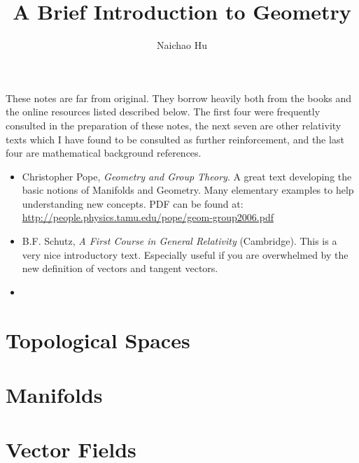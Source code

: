 \documentclass[a4paper,11pt]{article}
\title{\boldmath A Brief Introduction to Geometry}
\author{Naichao Hu}
\affiliation{Department of Physics,\\Sun Yat-sen University}
\begin{document}
 
\maketitle
\flushbottom


\clearpage

\acknowledgments
These notes are far from original. They borrow heavily both from the books 
and the online resources listed described below. 
The first 
four 
were frequently consulted in the preparation of these notes, the next 
seven 
are other relativity texts which I have found to be consulted as further reinforcement, and the last
four 
are mathematical background references.
\begin{itemize}
\item Christopher Pope, \textit{Geometry and Group Theory}. A great
  text developing the basic notions of Manifolds and Geometry. Many
  elementary examples to help understanding new concepts. PDF can be
  found at:
  \url{http://people.physics.tamu.edu/pope/geom-group2006.pdf}
\item B.F. Schutz, \textit{A First Course in General Relativity}
  (Cambridge). This is a very nice introductory text. Especially
  useful if you are overwhelmed by the new definition of vectors and
  tangent vectors.
\item 
\end{itemize}

\clearpage

\section{Topological Spaces}
\label{s:topo}

\section{Manifolds}
\label{s:mani}

\section{Vector Fields}
\label{s:vefi}


\end{document}
